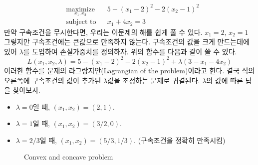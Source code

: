 \begin{equation*}
\begin{aligned}
& \underset{x_{1},x_{2}}{\text{maximize}}
& & 5-(x_{1}-2)^{2}-2(x_{2}-1)^{2}\\
& \text{subject to}
& & x_{1}+4x_{2}=3
\end{aligned}
\end{equation*}
만약 구속조건을 무시한다면, 우리는 이문제의 해를 쉽게 풀 수 있다. $x_{1}=2$, $x_{2}=1$ 그렇지만 구속조건에는 큰값으로 만족하지 않는다. 구속조건의 값을 크게 만드는데에 있어 $\lambda$를 도입하여 손실가중치를 정의하자. 위의 함수를 다음과 같이 쓸 수 있다.
\begin{equation}
L(x_{1},x_{2},\lambda)=5-(x_{1}-2)^{2}-2(x_{2}-1)^{2}+\lambda(3-x_{1}-4x_{2})
\end{equation}
이러한 함수를 문제의 라그랑지안(Lagrangian of the problem)이라고 한다. 결국 식의 오른쪽에 구속조건의 값이 추가된 $\lambda$값을 조정하는 문제로 귀결된다. $\lambda$의 값에 따른 답을 찾아보자.
\begin{itemize}
\item $\lambda=0$일 때, $(x_{1},x_{2})=(2,1)$.
\item $\lambda=1$일 때, $(x_{1},x_{2})=(3/2,0)$.
\item $\lambda=2/3$일 때, $(x_{1},x_{2})=(5/3,1/3)$. (구속조건을 정확히 만족시킴)
\end{itemize}

\begin{figure}[!hbpt]
\centering
{}
\label{fig:10-1}
\caption{Convex and concave problem}
\end{figure}

